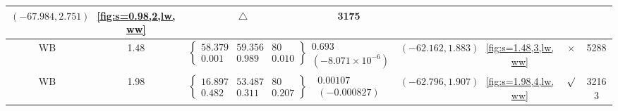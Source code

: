 \begin{table}[H]
\begin{adjustwidth}{-2.5cm}{-2.5cm}
{\begin{tabular}{|c|c|c|c|c|c|c|c|}
$(-67.984, 2.751)$ & 
\ref{fig:s=0.98,2,lw,ww} & $\triangle$ & 3175 \\
\hline
WB & 1.48 & $\left\{\begin{array}{ccc}
58.379 & 59.356 & 80 \\
0.001 & 0.989 & 0.010
\end{array}\right\}$ &
$\begin{array}{c}
0.693 \\
(-8.071\times 10^{-6})
\end{array}$ & 
$(-62.162, 1.883)$ & 
\ref{fig:s=1.48,3,lw,ww} & $\times$ & 5288 \\
\hline
WB & 1.98 & $\left\{\begin{array}{ccc}
16.897 & 53.487 & 80 \\
0.482 & 0.311 & 0.207
\end{array}\right\}$ &
$\begin{array}{c}
0.00107 \\
(-0.000827)
\end{array}$ & 
$(-62.796, 1.907)$ & 
\ref{fig:s=1.98,4,lw,ww} & $\surd$ & 32163 \\
\hline
\end{tabular}
}
\end{adjustwidth}
\end{table}

